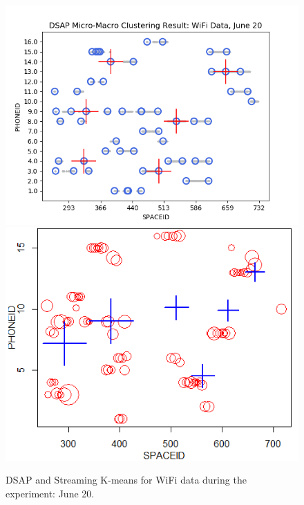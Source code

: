 \begin{figure}[!h]
    \centering
    \includegraphics[width = 7 cm]{image/Chapters/Chapter6/DSAPJune20.png}\hfill
    \includegraphics[width = 7 cm]{image/Chapters/Chapter6/june20DoubK.png}
    \\[\smallskipamount]    
    \caption{ DSAP and Streaming K-means for WiFi data during the experiment: June 20.}
    \label{3}
\end{figure}


